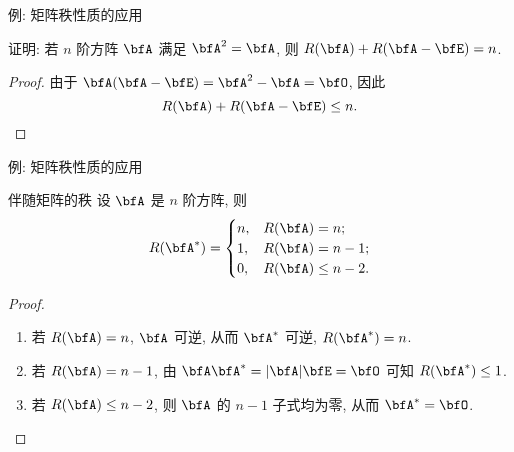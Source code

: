 \begin{frame}{例: 矩阵秩性质的应用}
	\onslide<+->
	\begin{example}
		证明: 若 $n$ 阶方阵 $\bfA$ 满足 $\bfA^2=\bfA$, 则 $R(\bfA)+R(\bfA-\bfE)=n$.
	\end{example}
	\onslide<+->
	\begin{proof}
		由于 $\bfA(\bfA-\bfE)=\bfA^2-\bfA=\bfO$, 因此
		\[R(\bfA)+R(\bfA-\bfE)\le n.\]
		\onslide<+->{%
			故 $R(\bfA)+R(\bfA-\bfE)=n$.\qedhere
		}
	\end{proof}
\end{frame}


\begin{frame}{例: 矩阵秩性质的应用}
	\onslide<+->
	\begin{second}{伴随矩阵的秩}
		设 $\bfA$ 是 $n$ 阶方阵, 则
		\[R(\bfA^*)=\begin{cases}
			n,&R(\bfA)=n;\\
			1,&R(\bfA)=n-1;\\
			0,&R(\bfA)\le n-2.
		\end{cases}\]
	\end{second}
	\onslide<+->
	\begin{proof}
		\begin{enumerate}
			\item 若 $R(\bfA)=n$, $\bfA$ 可逆, 从而 $\bfA^*$ 可逆, $R(\bfA^*)=n$.
			\item 若 $R(\bfA)=n-1$, 由 $\bfA\bfA^*=|\bfA|\bfE=\bfO$ 可知 $R(\bfA^*)\le 1$.
			\onslide<+->{故 $R(\bfA^*)=1$.}
			\item 若 $R(\bfA)\le n-2$, 则 $\bfA$ 的 $n-1$ 子式均为零, 从而 $\bfA^*=\bfO$.\qedhere
		\end{enumerate}
	\end{proof}
\end{frame}


